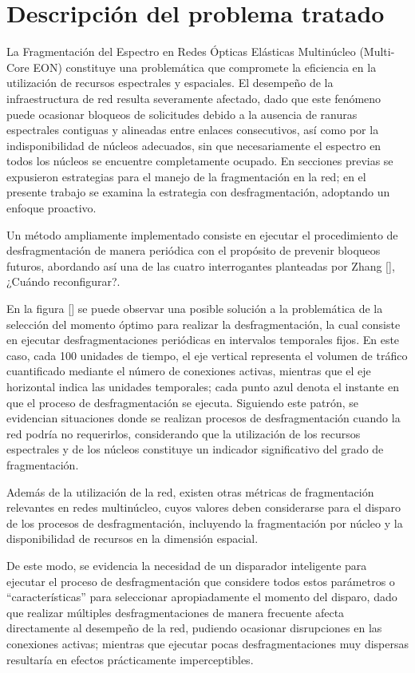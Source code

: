 \section{Descripción del problema tratado}
La Fragmentación del Espectro en Redes Ópticas Elásticas Multinúcleo (Multi-Core EON) constituye una problemática que compromete la eficiencia en la utilización de recursos espectrales y espaciales. El desempeño de la infraestructura de red resulta severamente afectado, dado que este fenómeno puede ocasionar bloqueos de solicitudes debido a la ausencia de ranuras espectrales contiguas y alineadas entre enlaces consecutivos, así como por la indisponibilidad de núcleos adecuados, sin que necesariamente el espectro en todos los núcleos se encuentre completamente ocupado. En secciones previas se expusieron estrategias para el manejo de la fragmentación en la red; en el presente trabajo se examina la estrategia con desfragmentación, adoptando un enfoque proactivo.
%

Un método ampliamente implementado consiste en ejecutar el procedimiento de desfragmentación de manera periódica con el propósito de prevenir bloqueos futuros, abordando así una de las cuatro interrogantes planteadas por Zhang [], ¿Cuándo reconfigurar?.
%

En la figura [] se puede observar una posible solución a la problemática de la selección del momento óptimo para realizar la desfragmentación, la cual consiste en ejecutar desfragmentaciones periódicas en intervalos temporales fijos. En este caso, cada 100 unidades de tiempo, el eje vertical representa el volumen de tráfico cuantificado mediante el número de conexiones activas, mientras que el eje horizontal indica las unidades temporales; cada punto azul denota el instante en que el proceso de desfragmentación se ejecuta. Siguiendo este patrón, se evidencian situaciones donde se realizan procesos de desfragmentación cuando la red podría no requerirlos, considerando que la utilización de los recursos espectrales y de los núcleos constituye un indicador significativo del grado de fragmentación.
%

Además de la utilización de la red, existen otras métricas de fragmentación relevantes en redes multinúcleo, cuyos valores deben considerarse para el disparo de los procesos de desfragmentación, incluyendo la fragmentación por núcleo y la disponibilidad de recursos en la dimensión espacial.
%

De este modo, se evidencia la necesidad de un disparador inteligente para ejecutar el proceso de desfragmentación que considere todos estos parámetros o ``características'' para seleccionar apropiadamente el momento del disparo, dado que realizar múltiples desfragmentaciones de manera frecuente afecta directamente al desempeño de la red, pudiendo ocasionar disrupciones en las conexiones activas; mientras que ejecutar pocas desfragmentaciones muy dispersas resultaría en efectos prácticamente imperceptibles.
%

